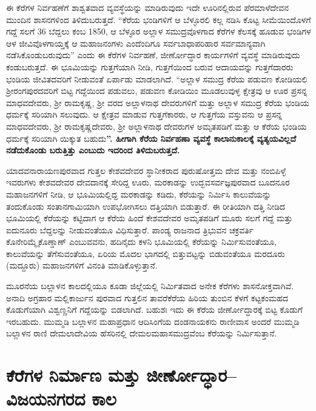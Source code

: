 ಈ ಕೆರೆಗಳ ನಿರ್ವಹಣೆಗೆ ಶಾಶ್ವತವಾದ ವ್ಯವಸ್ಥೆಯನ್ನು ಮಾಡಿರುವುದು ಇದೇ ಊರಿನಲ್ಲಿರುವ ಪೆರಮಾಳೆದೇವನ ಮುಂದಿನ ಶಾಸನಗಳಿಂದ ತಿಳಿದುಬರುತ್ತದೆ. “ಕೆರೆಯ ಭಂಡಿಗಳಿಗೆ ಆ ಬೆಳ್ಳೂರಲಿ ಕಲ್ಲ ನಡಿಸಿ ಕೊಟ್ಟ ಸೀಮೆಯಿಂದೊಳಗೆ ಗದ್ದೆ ಸಲಗೆ 36 ಬೆದ್ದಲು ಕಂಬ 1850, ಆ ಬೆಳ್ಳೂರ ಅಲ್ಲಾಳ ಸಮುದ್ರವೊಳಗಾದ ಕೆರೆಗಳ ಕೆಲಸಕ್ಕೆ ಹೂಡುವ ಭಂಡಿಗಳ ಆಳ ಜೀವಿವೊಳಗಾಯ್ತಕ್ಕೆ ಆ ಮಹಾಜನಂಗಳು ಎಂದೆಂದಿಗೂ ಸರ್ವಬಾಧಾಪರಿಹಾರ ಸರ್ವಮಾನ್ಯವಾಗಿ ನಡೆಸಿಕೊಂಡುಬರುವುದು” ಎಂದು ಈ ಕೆರೆಗಳ ನಿರ್ವಹಣೆ, ಜೀರ್ಣೋದ್ಧಾರ ಕಾರ್ಯಗಳಿಗೆ ವ್ಯವಸ್ಥೆ ಮಾಡಿರುವುದು ಕಂಡುಬರುತ್ತದೆ. ಈ ಭೂಮಿಯನ್ನು ಗುತ್ತಗೆಯಾಗಿ ನೀಡಿ, ಗುತ್ತಗೆಯಿಂದ ಬರುವ ಆದಾಯವನ್ನು ಗುತ್ತಗೆದಾರರು ಭಂಡಿಯ ಜೀವಿತದವರಿಗೆ ನೀಡುವಂತೆ ಏರ್ಪಾಡು ಮಾಡಲಾಗಿದೆ. “ಅಲ್ಲಾಳ ಸಮುದ್ರ ಕೆರೆಯ ಪಡುವಣ ಕೋಡಿಯಲಿ ಶ‍್ರೀರಂಗಪುರದವರಿಗೆ ಬಿಟ್ಟ ಗದ್ದೆಯಿಂದ ಪಡುವಲು, ಪಡುವಣ ಕೋಡಿಯಿಂ ಮೂಡಲುವುಳ್ಳ ಕ್ಷೇತ್ರವು ಆ ಊರ ಪ್ರಸನ್ನ ಮಾಧವದೇವರು, ಶ‍್ರೀ ರಾಮಕೃಷ್ಣ, ಶ‍್ರೀ ವರದ ಅಲ್ಲಾಳನಾಥ ದೇವರುಗಳಿಗೆ ಮತ್ತು ಅಲ್ಲಾಳ ಸಮುದ್ರ ಕೆರೆಯ ಭಂಡಿಯ ಧರ್ಮಕ್ಕೆ ಸರಿಯಾಗಿ ಸಲುವುದು. ಆ ಕ್ಷೇತ್ರವ ಮಾಡುವ ಗುತ್ತಗೆಕಾರರು, ಆ ಗುತ್ತಗೆಯ ವಸ್ತುವನು ಆ ಪ್ರಸನ್ನ ಮಾಧವದೇವರು, ಶ‍್ರೀ ರಾಮಕೃಷ್ಣದೇವರು, ಶ‍್ರೀ ಅಲ್ಲಾಳನಾಥ ದೇವರುಗಳ ಅಮೃತಪಡಿಗೆ ಮತ್ತು ಆ ಕೆರೆಯ ಭಂಡಿಯ ಧರ್ಮಕ್ಕೆ ಸರಿಯಾಗಿ ಯಿಕ್ಕುತ ಬಹುದು\textbf{”. ಹೀಗಾಗಿ ಕೆರೆಯ ನಿರ್ವಹಣಾ ವ್ಯವಸ್ಥೆ ಕಾಲಾನುಕಾಲಕ್ಕೆ ವ್ಯತ್ಯಯವಿಲ್ಲದೆ ನಡೆದುಕೊಂಡು ಬರುತ್ತಿತ್ತು ಎಂಬುದು ಇದರಿಂದ ತಿಳಿದುಬರುತ್ತದೆ. }

ಯಾದವನಾರಾಯಣಪುರವಾದ ಗುತ್ತಲ ಕೇಶವದೇವರ ಸ್ಥಾನೀಕರಾದ ಪುರುಷೋತ್ತಮ ದೇವ ಮತ್ತು ನಂಬಿಪಿಳ್ಳೆ ಇವರುಗಳು ಕೇಶವದೇವರ ದೇವದಾನಕ್ಕೆ ಸೇರಿದ್ದ ಊರು, ಮರಕಾಡನ್ನು ಉದ್ಭವಸರ್ವಜ್ಞಪುರವಾದ ಬೂದನೂರ ಮಹಾಜನ\-ಗಳಿಗೆ ನೀಡಿ, ಆ ಭೂಮಿಯಲ್ಲಿದ್ದ ಮರಕಾಡನ್ನು ಕಡಿದು, ಕೆರೆಯನ್ನು ನಿರ್ಮಿಸಿ ಕಾಲುವೆಯನ್ನು ತಂದುಕೊಂಡು ಸಂತಾನಗಾಮಿ\-ಯಾಗಿ ಉಪಭೋಗಿಸಲು ದತ್ತಿಯಾಗಿ ಬಿಡುತ್ತಾರೆ. ಈ ರೀತಿಯಾಗಿ ದತ್ತಿ ನೀಡಿದ ಭೂಮಿಯಲ್ಲಿ ಕೆರೆಯನ್ನು ಕಟ್ಟಿದಾಗ ಆ ಕೆರೆಯ ಹಿಂದೆ ಕೇಶವದೇವರ ಅಮೃತಪಡಿಗೆ ಮೂರು ಸಲಗೆ ಗದ್ದೆ ಮತ್ತು ಐದುನೂರು ಬೆದ್ದಲನ್ನು ನೀಡುವಂತೆಯೂ ವಿಧಿಸುತ್ತಾರೆ. ಪಾಂಡ್ಯ ರಾಜನಾದ ತ್ರಿಭುವನ ಚಕ್ರವರ್ತಿ ಕೊನೇರಿಮ್ಮೈಕೊಣ್ಡಾಣ್​ ಎಂಬುವವನು, ಹದಿನೈದು ಕಳನಿ ಭೂಮಿಯಲ್ಲಿ ಕೆರೆಯನ್ನು ನಿರ್ಮಿಸುವಂತೆಯೂ, ಕಾಲುವೆಯನ್ನು ತೆಗೆಸುವಂತೆಯೂ, ಏರಿಯ ಮೊದಲ ಭಾಗದಲ್ಲಿ ಬಿತ್ತುವಟ್ಟನ್ನು ಬಿಡುವಂತೆಯೂ ಮರದೂರು (ಮದ್ದೂರು) ಮಹಾಜನಗಳಿಗೆ ವಿನಂತಿ ಮಾಡಿಕೊಳ್ಳುತ್ತಾನೆ.

\newpage

ಮೂರನೆಯ ಬಲ್ಲಾಳನ ಕಾಲದಲ್ಲಿಯೂ ಕೂಡಾ ಜಿಲ್ಲೆಯಲ್ಲಿ ನಿರ್ಮಿತವಾದ ಅನೇಕ ಕೆರೆಗಳು ಶಾಸನೋಕ್ತವಾಗಿವೆ. ಅನಾದಿ ಅಗ್ರಹಾರ ಮಲ್ಲಿಕಾರ್ಜುನ ಪುರವಾದ ಗುತ್ತಲಿನ ತಾವರೆಕೆರೆಯ ಹಿರಿಯ ತುಂಬಿನ ಕೆಳಗೆ ಕಟ್ಟಕಂಮಹದ ಕೊಡುಗೆಯಾಗಿ ವಿಶ್ವಣ್ಣನಿಗೆ ಗದ್ದೆಯನ್ನು ಬಿಡಲಾಗಿದೆ. ಬಹುಶಃ ಇದು ಈ ಕೆರೆಯ ಜೀರ್ಣೋದ್ಧಾರಕ್ಕೆ ಬಿಟ್ಟ ಕೊಡುಗೆ ಇರಬಹುದು. ಮುಮ್ಮಡಿ ಬಲ್ಲಾಳನ ಮಹಾಪ್ರಧಾನ ಆದಿಸಿಂಗೆಯ ದಂಡನಾಯಕನು ರಾಣೀವಾಸ ಅಂದರೆ ಮುಮ್ಮಡಿ ಬಲ್ಲಾಳನ ರಾಣಿ ದೇಮಲಾದೇವಿಯ ಹೆಸರಿನಲ್ಲಿ ದೇಮಲಮಹಾಸಮುದ್ರವೆಂಬ ಕೆರೆಯನ್ನು ನಿರ್ಮಿಸುತ್ತಾನೆ.


\section{ಕೆರೆಗಳ ನಿರ್ಮಾಣ ಮತ್ತು ಜೀರ್ಣೋದ್ಧಾರ–ವಿಜಯನಗರದ ಕಾಲ}

